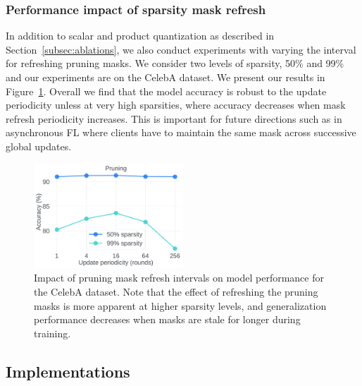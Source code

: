 \subsubsection{Performance impact of sparsity mask refresh}
\label{sparse_refresh}

In addition to scalar and product quantization as described in Section~\ref{subsec:ablations}, we also conduct experiments with varying the interval for refreshing pruning masks. We consider two levels of sparsity, 50\% and 99\% and our experiments are on the CelebA dataset. We present our results in Figure~\ref{fig:pruning}. Overall we find that the model accuracy is robust to the update periodicity unless at very high sparsities, where accuracy decreases when mask refresh periodicity increases. This is important for future directions such as in asynchronous FL where clients have to maintain the same mask across successive global updates.
\begin{figure}[t]
\label{fig-refresh}
    \centering
    \includegraphics[width=0.5\textwidth]{figs/pruning}
    \caption{\label{fig:pruning}
    Impact of pruning mask refresh intervals on model performance for the CelebA dataset. Note that the effect of refreshing the pruning masks is more apparent at higher sparsity levels, and generalization performance decreases when masks are stale for longer during training. }
\end{figure}


\subsection{\SecInd Implementations}
\label{appendix:secind}

